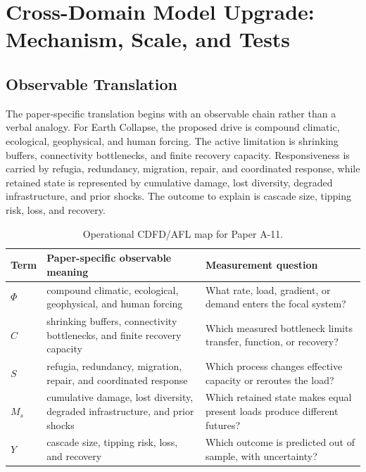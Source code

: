 \documentclass[11pt,a4paper]{article}
\begin{document}
\section{Cross-Domain Model Upgrade: Mechanism, Scale, and Tests}

\subsection{Observable Translation}

The paper-specific translation begins with an observable chain rather than a
verbal analogy. For Earth Collapse, the proposed drive is compound climatic, ecological, geophysical, and human forcing.
The active limitation is shrinking buffers, connectivity bottlenecks, and finite recovery capacity. Responsiveness is carried by
refugia, redundancy, migration, repair, and coordinated response, while retained state is represented by
cumulative damage, lost diversity, degraded infrastructure, and prior shocks. The outcome to explain is cascade size, tipping risk, loss, and recovery.

\begin{table}[htbp]
\centering
\small
\caption{Operational CDFD/AFL map for Paper A-11.}
\begin{tabularx}{\textwidth}{|l|X|X|}
\hline
\textbf{Term} & \textbf{Paper-specific observable meaning} & \textbf{Measurement question} \\
\hline
$\Phi$ & compound climatic, ecological, geophysical, and human forcing & What rate, load, gradient, or demand enters the focal system? \\
\hline
$C$ & shrinking buffers, connectivity bottlenecks, and finite recovery capacity & Which measured bottleneck limits transfer, function, or recovery? \\
\hline
$S$ & refugia, redundancy, migration, repair, and coordinated response & Which process changes effective capacity or reroutes the load? \\
\hline
$M_s$ & cumulative damage, lost diversity, degraded infrastructure, and prior shocks & Which retained state makes equal present loads produce different futures? \\
\hline
$Y$ & cascade size, tipping risk, loss, and recovery & Which outcome is predicted out of sample, with uncertainty? \\
\hline
\end{tabularx}
\end{table}
\end{document}
